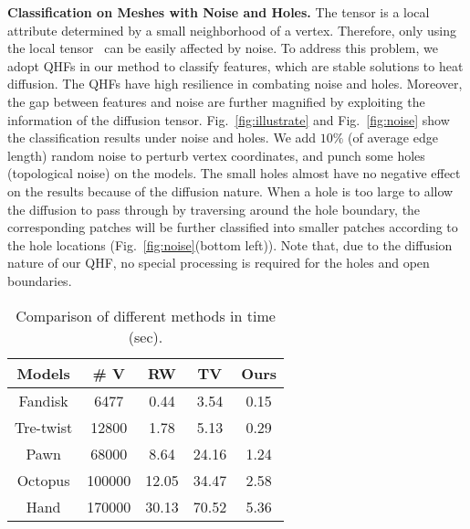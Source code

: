 \documentclass[10pt,journal,cspaper,compsoc]{IEEEtran}
\begin{document}
\textbf{Classification on Meshes with Noise and Holes.}
The tensor is a local attribute determined by a small neighborhood of
a vertex. Therefore, only using the local tensor~\cite{KCL09} can be
easily affected by noise. To address this problem, we adopt QHFs in
our method to classify features, which are stable solutions to heat
diffusion. The QHFs have high resilience in combating noise and holes.
Moreover, the gap between features and noise are further magnified by
exploiting the information of the diffusion tensor.
Fig.~\ref{fig:illustrate} and Fig.~\ref{fig:noise} show the
classification results under noise and holes. We add $10\%$ (of
average edge length) random noise to perturb vertex coordinates, and
punch some holes (topological noise) on the models. The small holes
almost have no negative effect on the results because of the diffusion
nature. When a hole is too large to allow the diffusion to pass
through by traversing around the hole boundary, the corresponding
patches will be further classified into smaller patches according to
the hole locations (Fig.~\ref{fig:noise}(bottom left)). Note that, due
to the diffusion nature of our QHF, no special processing is required
for the holes and open boundaries.


\begin{table}
\renewcommand{\arraystretch}{1.3}
\label{table:2}
\caption{Comparison of different methods in time (sec).}
\centering
\begin{tabular}{c||c|c|c|c}
\hline          Models    & \# V             & RW               & TV                 & Ours \\
\hline\hline  Fandisk     &  6477             & 0.44                  & 3.54               & 0.15 \\
\hline  Tre-twist          &12800          & 1.78                  & 5.13               & 0.29 \\
\hline  Pawn              &68000               & 8.64                  & 24.16              & 1.24 \\
\hline  Octopus            &100000          & 12.05                 & 34.47             & 2.58 \\
\hline  Hand               &170000          & 30.13                 & 70.52              & 5.36\\
\hline
\end{tabular}
\end{table}
\end{document}
